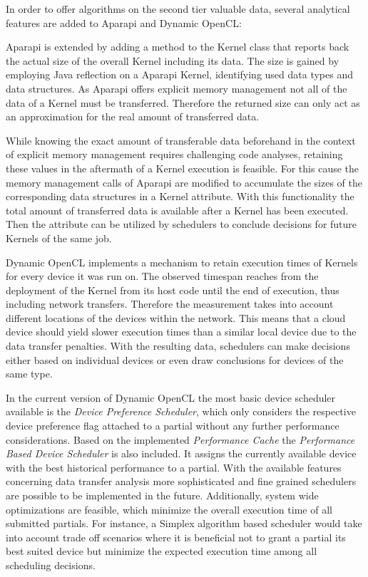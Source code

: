 In order to offer algorithms on the second tier valuable data, several analytical features are added to Aparapi and Dynamic OpenCL:
\begin{description}[style=nextline]
	\item[Kernel Data Size] 
	Aparapi is extended by adding a method to the Kernel class that reports back the actual size of the overall Kernel including its data. The size is gained by employing Java reflection on a Aparapi Kernel, identifying used data types and data structures. As Aparapi offers explicit memory management not all of the data of a Kernel must be transferred. Therefore the returned size can only act as an approximation for the real amount of transferred data.
	\item[Historical Data Transfer] 
	While knowing the exact amount of transferable data beforehand in the context of explicit memory management requires challenging code analyses, retaining these values in the aftermath of a Kernel execution is feasible. For this cause the memory management calls of Aparapi are modified to accumulate the sizes of the corresponding data structures in a Kernel attribute. With this functionality the total amount of transferred data is available after a Kernel has been executed. Then the attribute can be utilized by schedulers to conclude decisions for future Kernels of the same job.
	\item[Performance Cache]
	Dynamic OpenCL implements a mechanism to retain execution times of Kernels for every device it was run on. The observed timespan reaches from the deployment of the Kernel from its host code until the end of execution, thus including network transfers. Therefore the measurement takes into account different locations of the devices within the network. This means that a cloud device should yield slower execution times than a similar local device due to the data transfer penalties. With the resulting data, schedulers can make decisions either based on individual devices or even draw conclusions for devices of the same type.
\end{description}

In the current version of Dynamic OpenCL the most basic device scheduler available is the \textit{Device Preference Scheduler}, which only considers the respective device preference flag attached to a partial without any further performance considerations.
Based on the implemented \textit{Performance Cache} the \textit{Performance Based Device Scheduler} is also included. It assigns the currently available device with the best historical performance to a partial. With the available features concerning data transfer analysis more sophisticated and fine grained schedulers are possible to be implemented in the future. Additionally, system wide optimizations are feasible, which minimize the overall execution time of all submitted partials. For instance, a Simplex algorithm based scheduler would take into account trade off scenarios where it is beneficial not to grant a partial its best suited device but minimize the expected execution time among all scheduling decisions. 

